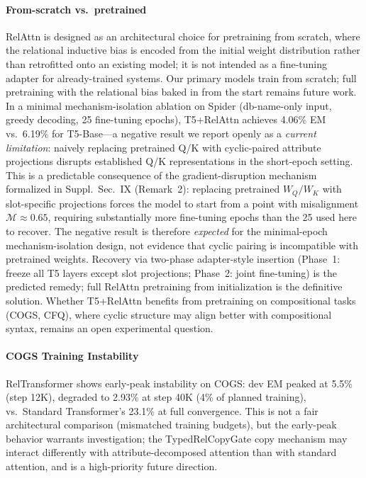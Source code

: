 \documentclass[conference]{IEEEtran}
\begin{document}
\paragraph{From-scratch vs.\ pretrained}
\label{sec:limitations}
RelAttn is designed as an architectural choice for pretraining from scratch, where the relational inductive bias is encoded from the initial weight distribution rather than retrofitted onto an existing model; it is not intended as a fine-tuning adapter for already-trained systems. Our primary models train from scratch; full pretraining with the relational bias baked in from the start remains future work. In a minimal mechanism-isolation ablation on Spider (db-name-only input, greedy decoding, 25 fine-tuning epochs), T5+RelAttn achieves 4.06\% EM vs.\ 6.19\% for T5-Base---a negative result we report openly as a \emph{current limitation}: naively replacing pretrained Q/K with cyclic-paired attribute projections disrupts established Q/K representations in the short-epoch setting. This is a predictable consequence of the gradient-disruption mechanism formalized in Suppl.\ Sec.~IX (Remark~2): replacing pretrained $W_Q/W_K$ with slot-specific projections forces the model to start from a point with misalignment $\mathcal{M}{\approx}0.65$, requiring substantially more fine-tuning epochs than the 25 used here to recover. The negative result is therefore \emph{expected} for the minimal-epoch mechanism-isolation design, not evidence that cyclic pairing is incompatible with pretrained weights. Recovery via two-phase adapter-style insertion (Phase~1: freeze all T5 layers except slot projections; Phase~2: joint fine-tuning) is the predicted remedy; full RelAttn pretraining from initialization is the definitive solution. Whether T5+RelAttn benefits from pretraining on compositional tasks (COGS, CFQ), where cyclic structure may align better with compositional syntax, remains an open experimental question.

\paragraph{COGS Training Instability}
RelTransformer shows early-peak instability on COGS: dev EM peaked at 5.5\% (step 12K), degraded to 2.93\% at step 40K (4\% of planned training), vs.\ Standard Transformer's 23.1\% at full convergence. This is not a fair architectural comparison (mismatched training budgets), but the early-peak behavior warrants investigation; the TypedRelCopyGate copy mechanism may interact differently with attribute-decomposed attention than with standard attention, and is a high-priority future direction.
\end{document}

